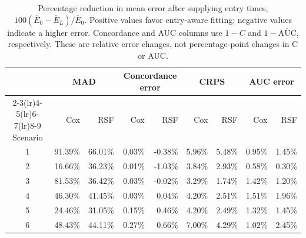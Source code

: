 \begin{table}[htbp]
\centering\small
\setlength{\tabcolsep}{3pt}
\begin{tabular}{crrrrrrrr}
\toprule
 & \multicolumn{2}{c}{MAD} & \multicolumn{2}{c}{Concordance error} & \multicolumn{2}{c}{CRPS} & \multicolumn{2}{c}{AUC error} \\
\cmidrule(lr){2-3}\cmidrule(lr){4-5}\cmidrule(lr){6-7}\cmidrule(lr){8-9}
Scenario & Cox & RSF & Cox & RSF & Cox & RSF & Cox & RSF \\
\midrule
1 & 91.39\% & 66.01\% & 0.03\% & -0.38\% & 5.96\% & 5.48\% & 0.95\% & 1.45\% \\
2 & 16.66\% & 36.23\% & 0.01\% & -1.03\% & 3.84\% & 2.93\% & 0.58\% & 0.30\% \\
3 & 81.53\% & 36.42\% & 0.03\% & -0.02\% & 3.29\% & 1.74\% & 1.42\% & 1.20\% \\
4 & 46.30\% & 41.45\% & 0.03\% & 0.04\% & 4.20\% & 2.51\% & 1.51\% & 1.96\% \\
5 & 24.46\% & 31.05\% & 0.15\% & 0.46\% & 4.20\% & 2.49\% & 1.32\% & 1.45\% \\
6 & 48.43\% & 44.11\% & 0.27\% & 0.66\% & 7.00\% & 4.29\% & 1.02\% & 2.45\% \\
\bottomrule
\end{tabular}
\caption{Percentage reduction in mean error after supplying entry times, $100(\overline E_0-\overline E_L)/\overline E_0$. Positive values favor entry-aware fitting; negative values indicate a higher error. Concordance and AUC columns use $1-C$ and $1-\overline{\mathrm{AUC}}$, respectively. These are relative error changes, not percentage-point changes in C or AUC.}
\label{tab:metric-reductions}
\end{table}
